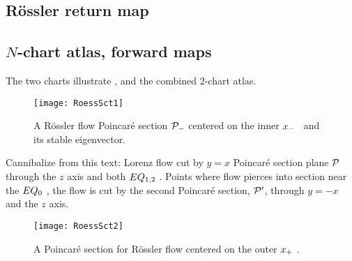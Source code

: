\subsection{R\"ossler return map}
\subsection{$N$-chart atlas, forward maps}

    \ifdraft\color{blue}


The two charts
 illustrate \poincBord,
and  the combined 2-chart atlas.

\begin{figure}%
\begin{center}
  \texttt{[image: RoessSct1]}
\end{center}
  \caption{\label{fig:RoessSct1}
  A R\"ossler flow Poincar\'e section ${\cal P}_{-}$ centered on the inner
  {\eqv} $x_{-}$ \template\ and its stable eigenvector.
}
\end{figure}

Cannibalize from this text:
Lorenz flow cut by  $y=x$ Poincar\'e section plane ${\cal P}$ through the
$z$ axis and both $EQ_{1,2}$ \eqva. Points where flow pierces into
section %
near the $EQ_{0}$ \eqv, the flow is cut by the second Poincar\'e
section,  ${\cal P}'$, through $y=-x$ and the $z$ axis.

\begin{figure}%
\begin{center}
  \texttt{[image: RoessSct2]}
\end{center}
  \caption[R\"ossler section, outer {\eqv}]{
  A Poincar\'e section for R\"ossler flow
      centered on the
      outer
  {\eqv} $x_{+}$ \template.
  } \label{fig:RoessSct2}
\end{figure}

